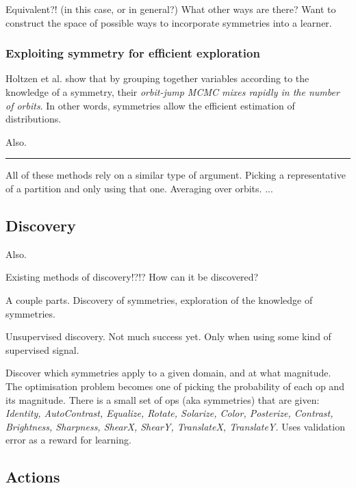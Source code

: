 Equivalent?! (in this case, or in general?)
What other ways are there? Want to construct the space of possible ways to incorporate symmetries into a learner.

\subsubsection{Exploiting symmetry for efficient exploration}

Holtzen et al. \cite{Holtzen2019} show that by grouping together variables according to
the knowledge of a symmetry, their \textit{orbit-jump MCMC mixes rapidly in the number of orbits}.
In other words, symmetries allow the efficient estimation of distributions.

Also. \cite{Campbell2019}

\begin{center}\rule{0.5\linewidth}{\linethickness}\end{center}

All of these methods rely on a similar type of argument. Picking a representative
of a partition and only using that one. Averaging over orbits. ...

\subsection{Discovery}

Also.

Existing methods of discovery!?!?
 How can it be discovered?

 A couple parts. Discovery of symmetries, exploration of the knowledge of symmetries.

 Unsupervised discovery. Not much success yet. Only when using some kind of supervised signal.

 \cite{Ho2019a, Lim2019, Cubuk2018, Cubuk2019}
 Discover which symmetries apply to a given domain, and at what magnitude.
 The optimisation problem becomes one of picking the probability of each op and its magnitude.
 There is a small set of ops (aka symmetries) that are given:
 \textit{Identity, AutoContrast, Equalize, Rotate, Solarize, Color, Posterize, Contrast,
 	Brightness, Sharpness, ShearX, ShearY, TranslateX, TranslateY.}
 Uses validation error as a reward for learning.

\subsection{Actions}\label{construct-actions}

